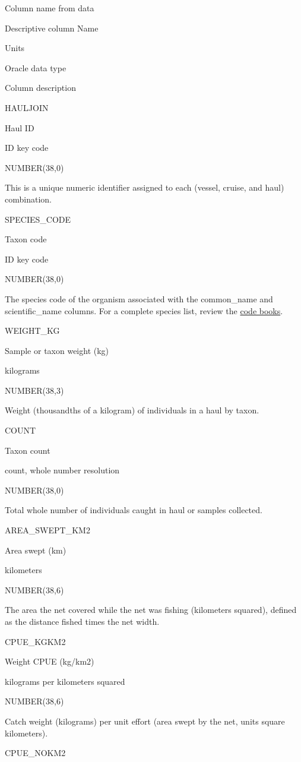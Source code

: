\documentclass[
  letterpaper,
  oneside,
  open=any]{scrbook}
\begin{document}
Column name from data

Descriptive column Name

Units

Oracle data type

Column description

HAULJOIN

Haul ID

ID key code

NUMBER(38,0)

This is a unique numeric identifier assigned to each (vessel, cruise,
and haul) combination.

SPECIES\_CODE

Taxon code

ID key code

NUMBER(38,0)

The species code of the organism associated with the common\_name and
scientific\_name columns. For a complete species list, review the
\href{https://www.fisheries.noaa.gov/resource/document/groundfish-survey-species-code-manual-and-data-codes-manual}{code
books}.

WEIGHT\_KG

Sample or taxon weight (kg)

kilograms

NUMBER(38,3)

Weight (thousandths of a kilogram) of individuals in a haul by taxon.

COUNT

Taxon count

count, whole number resolution

NUMBER(38,0)

Total whole number of individuals caught in haul or samples collected.

AREA\_SWEPT\_KM2

Area swept (km)

kilometers

NUMBER(38,6)

The area the net covered while the net was fishing (kilometers squared),
defined as the distance fished times the net width.

CPUE\_KGKM2

Weight CPUE (kg/km2)

kilograms per kilometers squared

NUMBER(38,6)

Catch weight (kilograms) per unit effort (area swept by the net, units
square kilometers).

CPUE\_NOKM2
\end{document}
